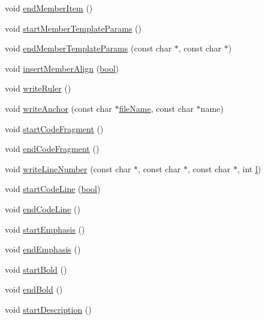 \begin{DoxyCompactItemize}
\item 
void \hyperlink{class_r_t_f_generator_adfbb9b8fb310181f9c66383d6ebe84b7}{end\+Member\+Item} ()
\item 
void \hyperlink{class_r_t_f_generator_a61df52cef3429c7db462e28a3f39937c}{start\+Member\+Template\+Params} ()
\item 
void \hyperlink{class_r_t_f_generator_a6b09bc398bb77e562c3847c94ef1d663}{end\+Member\+Template\+Params} (const char $\ast$, const char $\ast$)
\item 
void \hyperlink{class_r_t_f_generator_aeae50b322d39c2db900f5bc883cb4519}{insert\+Member\+Align} (\hyperlink{qglobal_8h_a1062901a7428fdd9c7f180f5e01ea056}{bool})
\item 
void \hyperlink{class_r_t_f_generator_a97d0c2260e0642d5b6ac0117b2e91687}{write\+Ruler} ()
\item 
void \hyperlink{class_r_t_f_generator_a425368bac3a2fb414b747ae60a1e2301}{write\+Anchor} (const char $\ast$\hyperlink{class_output_generator_a9bb808101dbeae7732bb0fa66cad9176}{file\+Name}, const char $\ast$name)
\item 
void \hyperlink{class_r_t_f_generator_ac7783a014fb21a8688b4f334aea2cc30}{start\+Code\+Fragment} ()
\item 
void \hyperlink{class_r_t_f_generator_ae75111adf81a1179b924ab7656d8c74c}{end\+Code\+Fragment} ()
\item 
void \hyperlink{class_r_t_f_generator_a4e6a13e14340ff6585c305d3c9b55c4f}{write\+Line\+Number} (const char $\ast$, const char $\ast$, const char $\ast$, int \hyperlink{060__command__switch_8tcl_aff56f84b49947b84b2a304f51cf8e678}{l})
\item 
void \hyperlink{class_r_t_f_generator_abd342f1207b80ca7ef8badcf659a0b58}{start\+Code\+Line} (\hyperlink{qglobal_8h_a1062901a7428fdd9c7f180f5e01ea056}{bool})
\item 
void \hyperlink{class_r_t_f_generator_a3f63e2fedfb61f656e35df2054a6d772}{end\+Code\+Line} ()
\item 
void \hyperlink{class_r_t_f_generator_a235071d9e43bed7dabaec79e88bf43c7}{start\+Emphasis} ()
\item 
void \hyperlink{class_r_t_f_generator_a283896a8d13cd017f4b765d82ba1e132}{end\+Emphasis} ()
\item 
void \hyperlink{class_r_t_f_generator_acb774060df0aaad9be8f91018503b20b}{start\+Bold} ()
\item 
void \hyperlink{class_r_t_f_generator_a430a7df863505527d0b1da4c70116a05}{end\+Bold} ()
\item 
void \hyperlink{class_r_t_f_generator_a9c6c7896f2bd09fb5e6ce53b9e6cee5c}{start\+Description} ()

\end{DoxyCompactItemize}
